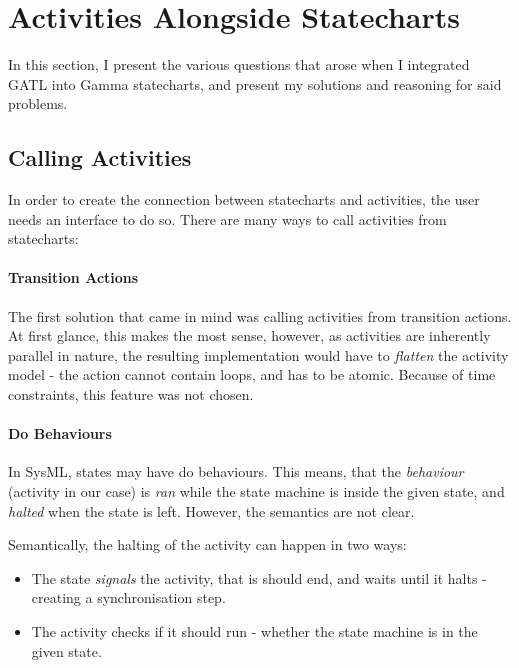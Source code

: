 \section{Activities Alongside Statecharts}\label{sec:activities-alongside-statecharts}

In this section, I present the various questions that arose when I integrated GATL into Gamma statecharts, and present my solutions and reasoning for said problems.

\subsection{Calling Activities}\label{ssec:calling-activities}

In order to create the connection between statecharts and activities, the user needs an interface to do so. There are many ways to call activities from statecharts:

\paragraph{Transition Actions}

The first solution that came in mind was calling activities from transition actions. At first glance, this makes the most sense, however, as activities are inherently parallel in nature, the resulting implementation would have to \emph{flatten} the activity model - the action cannot contain loops, and has to be atomic. Because of time constraints, this feature was not chosen. 

\paragraph{Do Behaviours}

In SysML, states may have do behaviours. This means, that the \emph{behaviour} (activity in our case) is \emph{ran} while the state machine is inside the given state, and \emph{halted} when the state is left. However, the semantics are not clear.

Semantically, the halting of the activity can happen in two ways: 

\begin{itemize}
	\item The state \emph{signals} the activity, that is should end, and waits until it halts - creating a synchronisation step.
	\item The activity checks if it should run - whether the state machine is in the given state.
\end{itemize}

